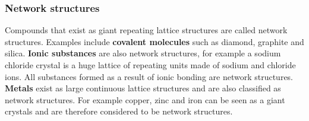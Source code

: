 \subsubsection*{Network structures}
Compounds that exist as giant repeating lattice structures are called network structures. Examples include \textbf{covalent molecules} such as diamond, graphite and silica. \textbf{Ionic substances} are also network structures, for example a sodium chloride crystal is a huge lattice of repeating units made of sodium and chloride ions. All substances formed as a result of ionic bonding are network structures. \textbf{Metals} exist as large continuous lattice structures and are also classified as network structures. For example copper, zinc and iron can be seen as a giant crystals and are therefore considered to be network structures.
